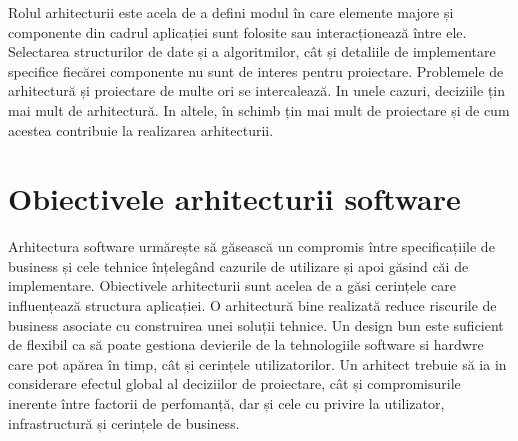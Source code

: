 \documentclass[12pt, a4paper, oneside, romanian]{teza-upb}
\begin{document}
Rolul arhitecturii este acela de a defini modul în care elemente majore și componente din cadrul aplicației sunt folosite sau interacționează între ele. Selectarea structurilor de date și a algoritmilor, cât și detaliile de implementare specifice fiecărei componente nu sunt de interes pentru proiectare. Problemele de arhitectură și proiectare de multe ori se intercalează. In unele cazuri, deciziile țin mai mult de arhitectură. In altele, în schimb țin mai mult de proiectare și de cum acestea contribuie la realizarea arhitecturii.

\section{Obiectivele arhitecturii software}

Arhitectura software urmărește să găsească un compromis între specificațiile de business și cele tehnice înțelegând cazurile de utilizare și apoi găsind căi de implementare. Obiectivele arhitecturii sunt acelea de a găsi cerințele care influențează structura aplicației. O arhitectură bine realizată reduce riscurile de business asociate cu construirea unei soluții tehnice. Un design bun este suficient de flexibil ca să poate gestiona devierile de la tehnologiile software si hardwre care pot apărea în timp, cât și cerințele utilizatorilor. Un arhitect trebuie să ia in considerare efectul global al deciziilor de proiectare, cât și compromisurile inerente între factorii de perfomanță, dar și cele cu privire la utilizator, infrastructură și cerințele de business.

\newpage
\end{document}
